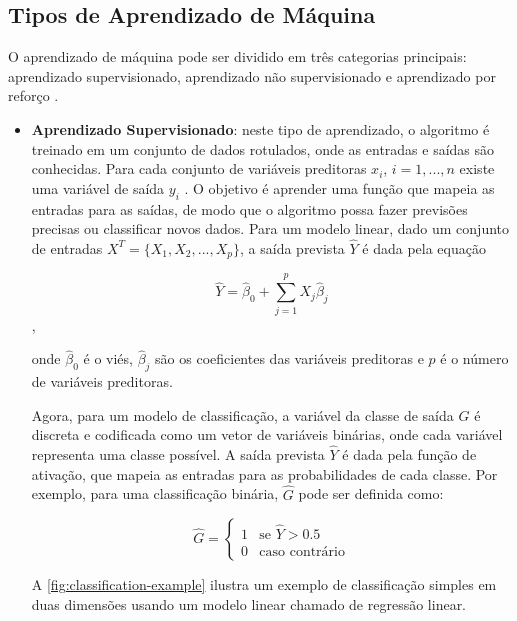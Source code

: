 \subsection{Tipos de Aprendizado de Máquina}

O aprendizado de máquina pode ser dividido em três categorias principais: aprendizado supervisionado, aprendizado não supervisionado e aprendizado por reforço \citep{Janiesch2021}.

\begin{itemize}
    \item \textbf{Aprendizado Supervisionado}: neste tipo de aprendizado, o algoritmo é treinado em um conjunto de dados rotulados, onde as entradas e saídas são conhecidas. Para cada conjunto de variáveis preditoras $x_i$, $i = 1,...,n$ existe uma variável de saída $y_i$ \citep{James2000}. O objetivo é aprender uma função que mapeia as entradas para as saídas, de modo que o algoritmo possa fazer previsões precisas ou classificar novos dados. Para um modelo linear, dado um conjunto de entradas $X^T = \{X_1, X_2, ..., X_p\}$, a saída prevista $\hat{Y}$ é dada pela equação
    
    \begin{equation}
        \hat{Y} = \hat{\beta}_0 + \sum_{j=1}^{p} X_j \hat{\beta}_j
    \end{equation},

    onde $\hat{\beta}_0$ é o viés, $\hat{\beta}_j$ são os coeficientes das variáveis preditoras e $p$ é o número de variáveis preditoras.

    Agora, para um modelo de classificação, a variável da classe de saída $G$ é discreta e codificada como um vetor de variáveis binárias, onde cada variável representa uma classe possível. A saída prevista $\hat{Y}$ é dada pela função de ativação, que mapeia as entradas para as probabilidades de cada classe. Por exemplo, para uma classificação binária, $\hat{G}$ pode ser definida como:

    \begin{equation}
        \hat{G} = 
        \begin{cases}
            1 & \text{se } \hat{Y} > 0.5 \\
            0 & \text{caso contrário}
        \end{cases}
    \end{equation}

    A \autoref{fig:classification-example} ilustra um exemplo de classificação simples em duas dimensões usando um modelo linear chamado de regressão linear.


\end{itemize}
